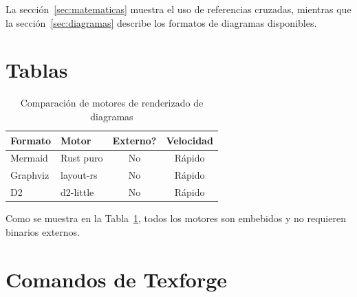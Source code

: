 \documentclass[a4paper,12pt]{article}
\begin{document}
  La sección~\ref{sec:matematicas} muestra el uso de referencias cruzadas,
  mientras que la sección~\ref{sec:diagramas} describe los formatos de
  diagramas disponibles.

  \section{Tablas}\label{sec:tablas}

  \begin{table}[H]
    \centering
    \caption{Comparación de motores de renderizado de diagramas}
    \label{tab:motores}
    \begin{tabular}{@{}llcc@{}}
      \toprule
      \textbf{Formato} & \textbf{Motor} & \textbf{Externo?} & \textbf{Velocidad} \\
      \midrule
      Mermaid    & Rust puro         & No  & Rápido   \\
      Graphviz   & layout-rs         & No  & Rápido   \\
      D2         & d2-little         & No  & Rápido   \\
      \bottomrule
    \end{tabular}
  \end{table}

  Como se muestra en la Tabla~\ref{tab:motores}, todos los motores son
  embebidos y no requieren binarios externos.

  \section{Comandos de Texforge}\label{sec:comandos}
\end{document}
